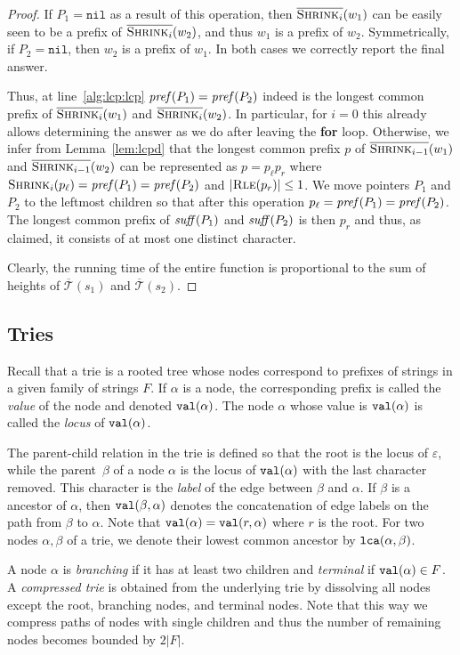 \documentclass[a4paper]{article}
\theoremstyle{remark}
\newcommand{\rle}{\textsc{Rle}}
\newcommand{\shrink}[1]{\ensuremath{\textsc{Shrink}_{#1}}}
\newcommand{\cshrink}[1]{\ensuremath{\overline{\textsc{Shrink}_{#1}}}}
\newcommand{\ustree}{\mathcal{\overline{T}}}
\newcommand{\itnil}{\mathtt{nil}}
\newcommand{\eps}{\varepsilon}
\begin{document}
\begin{proof}
If $P_1=\itnil$ as a result of this operation, then $\cshrink{i}(w_1)$ can be easily seen to be a prefix of $\cshrink{i}(w_2)$,
and thus $w_1$ is a prefix of $w_2$.
Symmetrically, if $P_2=\itnil$, then $w_2$ is a prefix of $w_1$. In both cases we correctly report the final answer.

Thus, at line~\ref{alg:lcp:lcp} $\mathit{pref}(P_1)=\mathit{pref}(P_2)$ indeed is the longest common prefix of $\cshrink{i}(w_1)$ and $\cshrink{i}(w_2)$.
In particular, for $i=0$ this already allows determining the answer as we do after leaving the \textbf{for} loop.
Otherwise, we infer from Lemma~\ref{lem:lcpd} that the longest common prefix $p$ of $\cshrink{i-1}(w_1)$
and $\cshrink{i-1}(w_2)$ can be represented as $p=p_\ell p_r$ where $\shrink{i}(p_\ell) = \itstring(P_1)=\itstring(P_2)$
and $|\rle(p_r)|\le 1$. We move pointers $P_1$ and $P_2$ to the leftmost children
so that after this operation $p_\ell=\mathit{pref}(P_1)=\mathit{pref}(P_2)$. The longest
common prefix of $\mathit{suff}(P_1)$ and $\mathit{suff}(P_2)$ is then $p_r$ and thus, as claimed, it
consists of at most one distinct character.

Clearly, the running time of the entire function is proportional to the sum of heights of $\ustree(s_1)$ and $\ustree(s_2)$.
\end{proof}


\subsection{Tries}
Recall that a trie is a rooted tree whose nodes correspond to prefixes of strings in a given family of strings $F$.
If $\alpha$ is a node, the corresponding prefix is called the \emph{value} of the node and denoted $\mathtt{val}(\alpha)$.
The node $\alpha$ whose value is $\mathtt{val}(\alpha)$ is called the \emph{locus} of $\mathtt{val}(\alpha)$.

The parent-child relation in the trie is defined so that the root is the locus of $\eps$,
while the parent~$\beta$ of a node $\alpha$ is the locus of $\mathtt{val}(\alpha)$ with the last character removed.
This character is the \emph{label} of the edge between $\beta$ and $\alpha$.
If $\beta$ is a ancestor of $\alpha$, then $\mathtt{val}(\beta,\alpha)$ denotes the concatenation
of edge labels on the path from $\beta$ to $\alpha$. Note that $\mathtt{val}(\alpha)=\mathtt{val}(r,\alpha)$ where $r$ is the root.
For two nodes $\alpha,\beta$ of a trie, we denote their lowest common ancestor by $\mathtt{lca}(\alpha,\beta)$.

A node $\alpha$ is \emph{branching} if it has at least two children and \emph{terminal} if $\mathtt{val}(\alpha)\in F$.
A \emph{compressed trie} is obtained from the underlying trie by dissolving all nodes except
the root, branching nodes, and terminal nodes. Note that this way we compress paths of nodes with single children
and thus the number of remaining nodes becomes bounded by $2|F|$.
\end{document}
